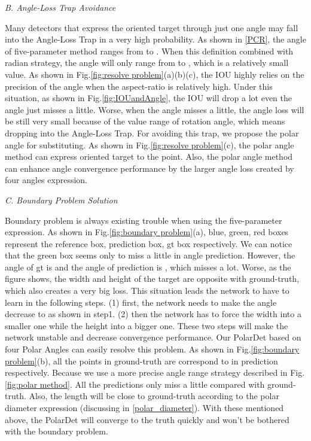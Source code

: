 \documentclass[10pt,twocolumn]{article}
\begin{document}
\emph{B. Angle-Loss Trap Avoidance}

Many detectors that express the oriented target through just one angle may fall into the Angle-Loss Trap in a very high probability. As shown in \ref{PCR}, the angle of five-parameter method ranges from  to . When this definition combined with radian strategy, the angle will only range from  to , which is a relatively small value. As shown in Fig.\ref{fig:resolve problem}(a)(b)(c), the IOU highly relies on the precision of the angle when the aspect-ratio is relatively high. Under this situation, as shown in Fig.\ref{fig:IOUandAngle}, the IOU will drop a lot even the angle just misses a little. Worse, when the angle misses a little, the angle loss will be still very small because of the value range of rotation angle, which means dropping into the Angle-Loss Trap. For avoiding this trap, we propose the polar angle for substituting. As shown in Fig.\ref{fig:resolve problem}(c), the polar angle method can express oriented target to the point. Also, the polar angle method can enhance angle convergence performance by the larger angle loss created by four angles expression.

\emph{C. Boundary Problem Solution}

Boundary problem is always existing trouble when using the five-parameter expression. As shown in Fig.\ref{fig:boundary problem}(a), blue, green, red boxes represent the reference box, prediction box, gt box respectively. We can notice that the green box seems only to miss a little in angle prediction. However, the angle of gt is  and the angle of prediction is , which misses a lot. Worse, as the figure shows, the width and height of the target are opposite with ground-truth, which also creates a very big loss. This situation leads the network to have to learn in the following steps. (1) first, the network needs to make the angle decrease to  as shown in step1. (2) then the network has to force the width into a smaller one while the height into a bigger one. These two steps will make the network unstable and decrease convergence performance. Our PolarDet based on four Polar Angles can easily resolve this problem. As shown in Fig.\ref{fig:boundary problem}(b), all the points  in ground-truth are correspond to  in prediction respectively. Because we use a more precise angle range strategy described in Fig.\ref{fig:polar method}. All the predictions only miss a little compared with ground-truth. Also, the length will be close to ground-truth according to the polar diameter expression (discussing in \ref{polar_diameter}). With these mentioned above, the PolarDet will converge to the truth quickly and won’t be bothered with the boundary problem.
\end{document}
